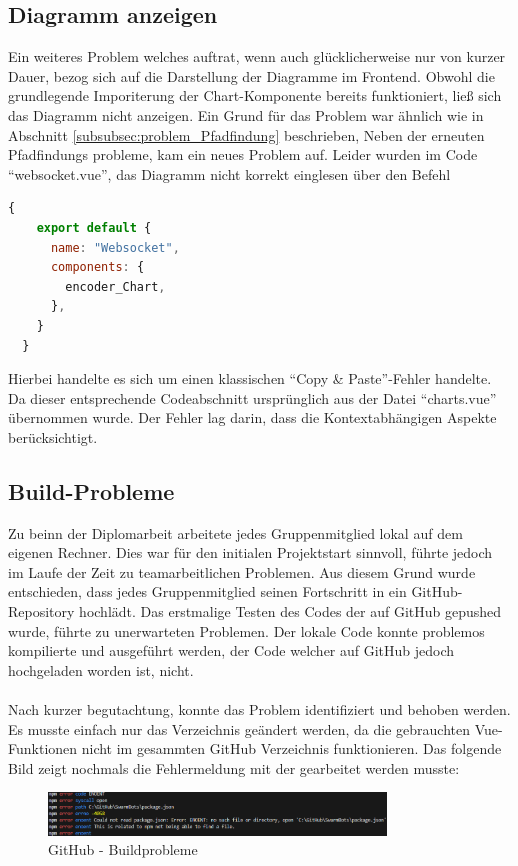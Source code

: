 \subsection{Diagramm anzeigen}
\label{subsubsec:problem_chart_anzeige}
Ein weiteres Problem welches auftrat, wenn auch glücklicherweise nur von kurzer Dauer,
bezog sich auf die Darstellung der Diagramme im Frontend.
%
Obwohl die grundlegende Imporiterung der Chart-Komponente bereits funktioniert, 
ließ sich das Diagramm nicht anzeigen.
%
Ein Grund für das Problem war ähnlich wie in Abschnitt \ref{subsubsec:problem_Pfadfindung} beschrieben,
%
Neben der erneuten Pfadfindungs probleme, kam ein neues Problem auf. 
Leider wurden im Code ``websocket.vue'', das Diagramm nicht korrekt einglesen über den Befehl
\begin{lstlisting}[language=JavaScript, gobble=4]
  {
    export default {
      name: "Websocket",
      components: {
        encoder_Chart,
      },
    }
  }
\end{lstlisting}
Hierbei handelte es sich um einen klassischen ``Copy \& Paste''-Fehler handelte.
Da dieser entsprechende Codeabschnitt ursprünglich aus der Datei ``charts.vue'' übernommen wurde.
%
Der Fehler lag darin, dass die Kontextabhängigen Aspekte berücksichtigt. 

\subsection{Build-Probleme}
\label{subsubsec:problem_Builden}
Zu beinn der Diplomarbeit arbeitete jedes Gruppenmitglied lokal auf dem eigenen Rechner.
%
Dies war für den initialen Projektstart sinnvoll, 
führte jedoch im Laufe der Zeit zu teamarbeitlichen Problemen. 
%
Aus diesem Grund wurde entschieden, dass jedes Gruppenmitglied seinen Fortschritt 
in ein GitHub-Repository hochlädt. 
%
Das erstmalige Testen des Codes der auf GitHub gepushed wurde, führte zu unerwarteten Problemen.
Der lokale Code konnte problemos kompilierte und ausgeführt werden, 
der Code welcher auf GitHub jedoch hochgeladen worden ist, nicht.
%
\\\\
Nach kurzer begutachtung, konnte das Problem identifiziert und behoben werden.
Es musste einfach nur das Verzeichnis geändert werden, 
da die gebrauchten Vue-Funktionen nicht im gesammten GitHub Verzeichnis funktionieren.
%
Das folgende Bild zeigt nochmals die Fehlermeldung mit der gearbeitet werden musste:
\begin{figure}[H]
  \includegraphics[width=0.8\textwidth, center]{img/GitHub_Buildprobleme.png}
  \caption{GitHub - Buildprobleme}
  \label{fig:GitHub_Buildprobleme}
\end{figure}
